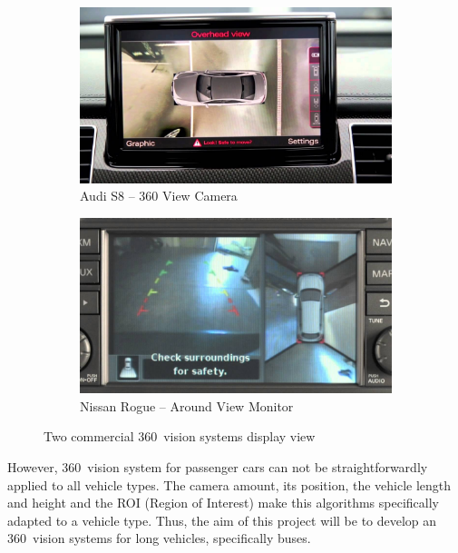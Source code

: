 \begin{figure}
	\centering
	\begin{subfigure}[b]{0.45\textwidth}
		\includegraphics[width=\textwidth]{images/audi-intro}
		\caption{Audi S8 -- 360 View Camera}
		\label{fig:audi-intro-example}
	\end{subfigure}
	\hspace{0.5cm}
	\begin{subfigure}[b]{0.45\textwidth}
		\includegraphics[width=\textwidth]{images/nissan-intro}
		\caption{Nissan Rogue -- Around View Monitor}
		\label{fig:nissan-intro-example}
	\end{subfigure}
	\caption{Two commercial 360\degree~vision systems display view}
	\label{fig:intro-example}
\end{figure}

However, 360\degree~vision system for passenger cars can not be straightforwardly applied to all vehicle types. The camera amount, its position, the vehicle length and height and the ROI (Region of Interest) make this algorithms specifically adapted to a vehicle type. Thus, the aim of this project will be to develop an 360\degree~vision systems for long vehicles, specifically buses. 

